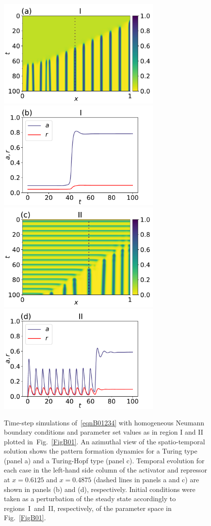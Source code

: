 \documentclass[11pt]{article}
\begin{document}
\begin{figure}[t!]
 		\includegraphics[width=3.2in]{Figures/ApFigure03a}
		\includegraphics[width=3.2in]{Figures/ApFigure03b}\\
		\includegraphics[width=3.2in]{Figures/ApFigure03c}
		\includegraphics[width=3.2in]{Figures/ApFigure03d}\\
		\caption{Time-step simulations of~\eqref{eqnB01234} with homogeneous Neumann boundary conditions and parameter set values as in region I and II plotted in~Fig.~\ref{FigB01}. An azimuthal view of the spatio-temporal solution shows the pattern formation dynamics for a Turing type (panel a) and a Turing-Hopf type (panel c). Temporal evolution for each case in the left-hand side column of the activator and repressor at $x=0.6125$ and $x=0.4875$ (dashed lines in panels a and c) are shown in panels (b) and (d), respectively. Initial conditions were taken as a perturbation of the steady state accordingly to regions~I~and~II, respectively, of the parameter space in Fig.~\ref{FigB01}.}
		\label{FigB03}
	\end{figure}
	
\end{document}
